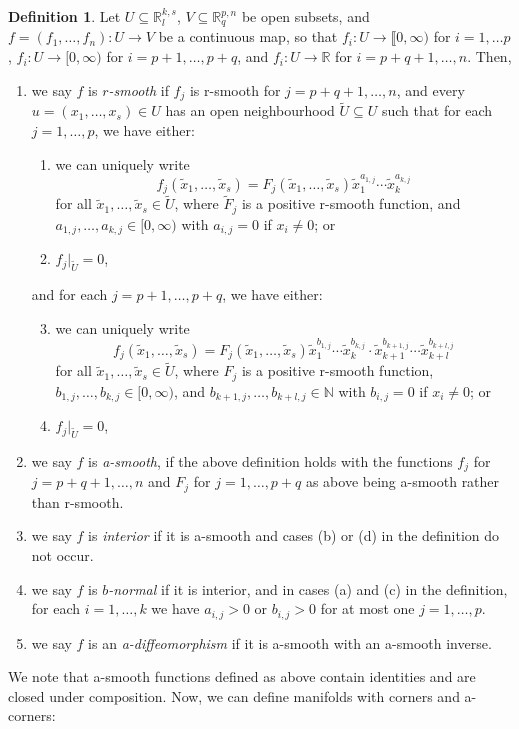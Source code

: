 \documentclass[10pt, a4paper]{article}
\theoremstyle{plain}%
\theoremstyle{definition}
\newtheorem{defn}[theorem]{Definition}
\numberwithin{figure}{section}
\numberwithin{equation}{section}
\newcommand{\bR}{\mathbb{R}}
\newcommand{\rt}{\rightarrow}
\begin{document}
\begin{defn}
	Let $U\subseteq \mathbb{R}^{k,s}_l$, $V\subseteq \mathbb{R}^{p,n}_q$ be open subsets, and $f=(f_1,\dots, f_n): U\rt V$ be a continuous map, so that $f_i:U\rt \llbracket 0,\infty)$ for $i=1,\dots p$, $f_i : U\rt [0,\infty)$ for $i = p+1,\dots, p+q$, and $f_i : U \rt \bR$ for $i=p+q+1,\dots, n$. Then,
	\begin{enumerate}
		\setcounter{enumi}{0}
		\item we say $f$ is \textit{$r$-smooth} if $f_j$ is r-smooth for $j=p+q+1,\dots, n$, and every $u = (x_1,\dots, x_s)\in U$ has an open neighbourhood $\tilde{U}\subseteq U$ such that for each $j=1,\dots, p$, we have either:
		\begin{enumerate}
			\item we can uniquely write \[f_j(\tilde{x}_1,\dots,\tilde{x}_s) = F_j(\tilde{x}_1,\dots,\tilde{x}_s)\tilde{x}_1^{a_{1,j}}\cdots \tilde{x}_{k}^{a_{k,j}} \]
			for all $\tilde{x}_1,\dots,\tilde{x}_s\in \tilde{U}$, where $\tilde{F}_j$ is a positive r-smooth function, and $a_{1,j},\dots, a_{k,j} \in [0,\infty)$ with $a_{i,j}= 0$ if $x_i\neq 0$; or
			\item $f_j|_{\tilde{U}}=0$,
		\end{enumerate}  
		and for each $j=p+1,\dots, p+q$, we have either:
		\begin{enumerate}
			\setcounter{enumii}{2}
			\item we can uniquely write \[f_j(\tilde{x}_1,\dots,\tilde{x}_s) = F_j(\tilde{x}_1,\dots,\tilde{x}_s)\tilde{x}_{1}^{b_{1,j}}\cdots \tilde{x}_{k}^{b_{k,j}}\cdot\tilde{x}_{k+1}^{b_{k+1,j}}\cdots \tilde{x}_{k+l}^{b_{k+l,j}} \]
			for all $\tilde{x}_1,\dots,\tilde{x}_s\in \tilde{U}$, where $F_j$ is a positive r-smooth function, $b_{1,j},\dots,b_{k,j} \in [0,\infty)$, and $b_{k+1,j},\dots, b_{k+l,j} \in \mathbb{N}$ with $b_{i,j}= 0$ if $x_i\neq 0$; or
			\item $f_j|_{\tilde{U}}=0$,
		\end{enumerate}  
		\item we say $f$ is \textit{a-smooth}, if the above definition holds with the functions $f_j$ for $j=p+q+1,\dots,n$ and $F_j$ for $j=1,\dots,p+q$ as above being a-smooth rather than r-smooth.
		\item we say $f$ is \textit{interior} if it is a-smooth and cases (b) or (d) in the definition do not occur.
		\item we say $f$ is \textit{$b$-normal} if it is interior, and in cases (a) and (c) in the definition, for each $i=1,\dots, k$ we have $a_{i,
			j}>0$ or $b_{i,j}>0$ for at most one $j=1,\dots, p$.
		\item we say $f$ is an \textit{a-diffeomorphism} if it is a-smooth with an a-smooth inverse.
	\end{enumerate} 
\end{defn}
We note that a-smooth functions defined as above contain identities and are closed under composition. Now, we can define manifolds with corners and a-corners:
\end{document}
